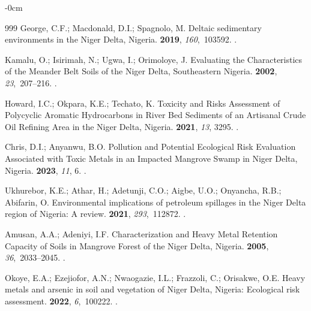 \documentclass[jmse,article,accept,pdftex,moreauthors]{Definitions/mdpi}
\begin{document}
\begin{adjustwidth}{-\extralength}{0cm}
\begin{thebibliography}{999}
George, C.F.; Macdonald, D.I.; Spagnolo, M.
\newblock Deltaic sedimentary environments in the Niger Delta, Nigeria.
 {\bf 2019}, {\em 160},~103592.
.

Kamalu, O.; Isirimah, N.; Ugwa, I.; Orimoloye, J.
\newblock Evaluating the Characteristics of the Meander Belt Soils of the Niger
  Delta, Southeastern Nigeria.
 {\bf 2002}, {\em 23},~207--216.
.

Howard, I.C.; Okpara, K.E.; Techato, K.
\newblock Toxicity and Risks Assessment of Polycyclic Aromatic Hydrocarbons in
  River Bed Sediments of an Artisanal Crude Oil Refining Area in the Niger
  Delta, Nigeria.
 {\bf 2021}, {\em 13}, 3295.
.

Chris, D.I.; Anyanwu, B.O.
\newblock Pollution and Potential Ecological Risk Evaluation Associated with
  Toxic Metals in an Impacted Mangrove Swamp in Niger Delta, Nigeria.
 {\bf 2023}, {\em 11}, 6.
.

Ukhurebor, K.E.; Athar, H.; Adetunji, C.O.; Aigbe, U.O.; Onyancha, R.B.;
  Abifarin, O.
\newblock Environmental implications of petroleum spillages in the Niger Delta
  region of Nigeria: A review.
 {\bf 2021}, {\em 293},~112872.
.

Amusan, A.A.; Adeniyi, I.F.
\newblock Characterization and Heavy Metal Retention Capacity of Soils in
  Mangrove Forest of the Niger Delta, Nigeria.
 {\bf 2005}, {\em 36},~2033--2045.
.

Okoye, E.A.; Ezejiofor, A.N.; Nwaogazie, I.L.; Frazzoli, C.; Orisakwe, O.E.
\newblock Heavy metals and arsenic in soil and vegetation of Niger Delta,
  Nigeria: Ecological risk assessment.
 {\bf 2022}, {\em 6},~100222.
.


\end{thebibliography}
\end{adjustwidth}
\end{document}
